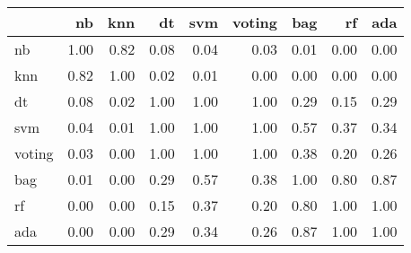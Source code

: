 \begin{tabular}{lrrrrrrrr}
\toprule
{} &   nb &  knn &   dt &  svm &  voting &  bag &   rf &  ada \\
\midrule
nb     & 1.00 & 0.82 & 0.08 & 0.04 &    0.03 & 0.01 & 0.00 & 0.00 \\
knn    & 0.82 & 1.00 & 0.02 & 0.01 &    0.00 & 0.00 & 0.00 & 0.00 \\
dt     & 0.08 & 0.02 & 1.00 & 1.00 &    1.00 & 0.29 & 0.15 & 0.29 \\
svm    & 0.04 & 0.01 & 1.00 & 1.00 &    1.00 & 0.57 & 0.37 & 0.34 \\
voting & 0.03 & 0.00 & 1.00 & 1.00 &    1.00 & 0.38 & 0.20 & 0.26 \\
bag    & 0.01 & 0.00 & 0.29 & 0.57 &    0.38 & 1.00 & 0.80 & 0.87 \\
rf     & 0.00 & 0.00 & 0.15 & 0.37 &    0.20 & 0.80 & 1.00 & 1.00 \\
ada    & 0.00 & 0.00 & 0.29 & 0.34 &    0.26 & 0.87 & 1.00 & 1.00 \\
\bottomrule
\end{tabular}
